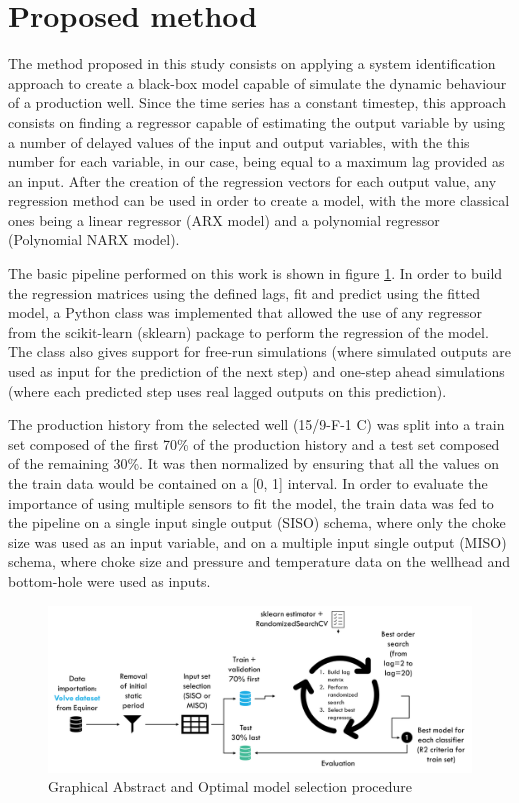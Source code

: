 \documentclass[conference]{IEEEtran}
\begin{document}
\section{Proposed method}\label{section_method}


The method proposed in this study consists on applying a system identification approach to create a black-box model capable of simulate the dynamic behaviour of a production well. Since the time series has a constant timestep, this approach consists on finding a regressor capable of estimating the output variable by using a number of delayed values of the input and output variables, with the this number for each variable, in our case, being equal to a maximum lag provided as an input. After the creation of the regression vectors for each output value, any regression method can be used in order to create a model, with the more classical ones being a linear regressor (ARX model) and a polynomial regressor (Polynomial NARX model).

The basic pipeline performed on this work is shown in figure \ref{graphical_abstract}. In order to build the regression matrices using the defined lags, fit and predict using the fitted model, a Python class was implemented that allowed the use of any regressor from the scikit-learn (sklearn) \cite{scikit-learn} package to perform the regression of the model. The class also gives support for free-run simulations (where simulated outputs are used as input for the prediction of the next step) and one-step ahead simulations (where each predicted step uses real lagged outputs on this prediction). 

The production history from the selected well (15/9-F-1 C) was split into a train set composed of the first 70\% of the production history and a test set composed of the remaining 30\%. It was then normalized by ensuring that all the values on the train data would be contained on a [0, 1] interval. In order to evaluate the importance of using multiple sensors to fit the model, the train data was fed to the pipeline on a single input single output (SISO) schema, where only the choke size was used as an input variable, and on a multiple input single output (MISO) schema, where choke size and pressure and temperature data on the wellhead and bottom-hole were used as inputs.

\begin{figure}[htbp]
\centerline{\includegraphics[width=6.0in]{images/graphical_abstract.png}}
\caption{Graphical Abstract and Optimal model selection procedure}
\label{graphical_abstract}
\end{figure}
\end{document}
